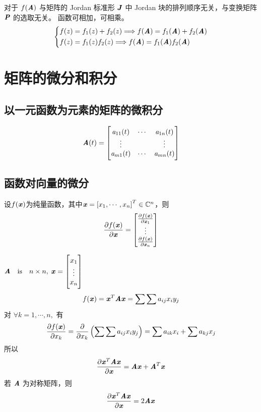\begin{theorem}
    对于 $f(\MA)$ 与矩阵的 Jordan 标准形 $\MJ$ 中 Jordan 块的排列顺序无关，与变换矩阵 $\MP$ 的选取无关。
    函数可相加，可相乘。
    \[
        \begin{dcases}
            f(z) = f_1(z) +f_2(z) \Longrightarrow f(\MA) = f_1(\MA) + f_2(\MA) \\
            f(z) = f_1(z) f_2(z) \Longrightarrow f(\MA) = f_1(\MA)  f_2(\MA)
        \end{dcases}
    \]
\end{theorem}

\section{矩阵的微分和积分}
\label{sec:矩阵的微分和积分}

\subsection{以一元函数为元素的矩阵的微积分}
\label{sub:以一元函数为元素的矩阵的微积分}

\[
    \MA(t) = \begin{bmatrix}
        \Sa_{11}(t) & \cdots    & \Sa_{1n}(t)   \\
        \vdots      &           & \vdots        \\
        \Sa_{m1}(t) & \cdots    & \Sa_{mn}(t)
    \end{bmatrix}
\]

\subsection{函数对向量的微分}
\label{sub:函数对向量的微分}

\begin{definition}
    设$f(\Vx)$为纯量函数，其中$\Vx = \left[x_1, \cdots, x_n \right]^T \in \SetC^n$，则
    \[
        \frac{\partial f(\Vx)}{\partial \Vx} =
        \begin{bmatrix}
            \frac{\partial f(\Vx)}{\partial \Vx_1} \\
            \vdots \\
            \frac{\partial f(\Vx)}{\partial \Vx_n}
        \end{bmatrix}
    \]
\end{definition}

\begin{example}
    $\ann,$ $\vxx$
    \[
        f(\Vx) = \Vx^T \MA \Vx = \sum \sum a_{ij} x_i y_j
    \]
    对 $\forall k = 1, \cdots , n,$ 有
    \[
        \frac{\partial f(\Vx)}{\partial x_k} = \frac{\partial}{\partial x_k} \left( \sum \sum a_{ij} x_i y_j \right) = \sum a_{ik}x_i + \sum a_{kj}x_j
    \]
    所以
    \[
        \frac{\partial \Vx^T \MA \Vx}{\partial \Vx} = \MA \Vx + \MA^T \Vx
    \]
    若 $\MA$ 为对称矩阵，则
    \[
        \frac{\partial \Vx^T \MA \Vx}{\partial \Vx} = 2 \MA \Vx
    \]
\end{example}

